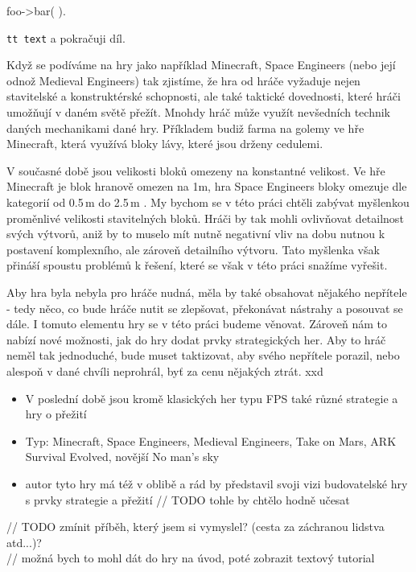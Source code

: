 \begin{code}
  foo->bar( ).
\end{code}

{\tt tt text} a pokračuji díl.


Když se podíváme na hry jako například Minecraft, Space Engineers (nebo její odnož Medieval Engineers) tak zjistíme, že hra od hráče vyžaduje nejen stavitelské a konstruktérské schopnosti, ale také taktické dovednosti, které hráči umožňují v daném světě přežít. Mnohdy hráč může využít nevšedních technik daných mechanikami dané hry. Příkladem budiž farma na golemy ve hře Minecraft, která využívá bloky lávy, které jsou drženy cedulemi\citep{minecraft_tut_farm}.

V současné době jsou velikosti bloků omezeny na konstantné velikost. Ve hře Minecraft je blok hranově omezen na 1m, hra Space Engineers bloky omezuje dle kategorií od 0.5\,\rm m do 2.5\,\rm m \citep{se_blocks_wiki}.
My bychom se v této práci chtěli zabývat myšlenkou proměnlivé velikosti stavitelných bloků. Hráči by tak mohli ovlivňovat detailnost svých výtvorů, aniž by to muselo mít nutně negativní vliv na dobu nutnou k postavení komplexního, ale zároveň detailního výtvoru. Tato myšlenka však přináší spoustu problémů k řešení, které se však v této práci snažíme vyřešit.

Aby hra byla nebyla pro hráče nudná, měla by také obsahovat nějakého nepřítele - tedy něco, co bude hráče nutit se zlepšovat, překonávat nástrahy a posouvat se dále. I tomuto elementu hry se v této práci budeme věnovat. Zároveň nám to nabízí nové možnosti, jak do hry dodat prvky strategických her. Aby to hráč neměl tak jednoduché, bude muset taktizovat, aby svého nepřítele porazil, nebo alespoň v dané chvíli neprohrál, byť za cenu nějakých ztrát. xxd

\begin{itemize}
	\item V poslední době jsou kromě klasických her typu FPS také různé strategie a hry o přežití
	\item Typ: Minecraft, Space Engineers, Medieval Engineers, Take on Mars, ARK Survival Evolved, novější No man's sky
	\item autor tyto hry má též v oblibě a rád by představil svoji vizi budovatelské hry s prvky strategie a přežití		// TODO tohle by chtělo hodně učesat
\end{itemize}		

// TODO zmínit příběh, který jsem si vymyslel? (cesta za záchranou lidstva atd...)? \\

// možná bych to mohl dát do hry na úvod, poté zobrazit textový tutorial

\fi
